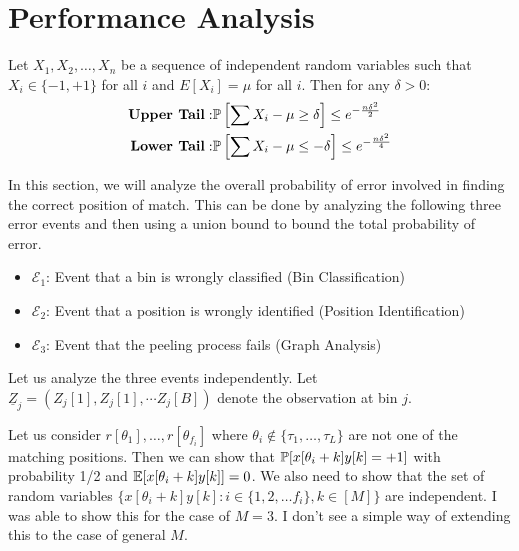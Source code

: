 \section{Performance Analysis}
\def\vgap{2pt}
\begin{lemma}
\label{Lem:Chernoff}
Let $X_1, X_2,\ldots, X_n$ be a sequence of independent random variables such that $X_i \in\{-1, +1\}$ for all $i$ and $E[X_i]=\mu$ for all $i$. Then for any $\delta>0$:
\begin{align*}
\text{\textbf{Upper Tail}}: &\mathbb{P}\left[\sum X_i-\mu\geq \delta\right]\leq e^{-\frac{n\delta^2}{2}}\\
\textbf{Lower Tail}: &\mathbb{P}\left[\sum X_i-\mu\leq -\delta\right]\leq e^{-\frac{n\delta^2}{4}}
\end{align*}
\end{lemma}


In this section, we will analyze the overall probability of error involved in finding the correct position of match. This can be done by analyzing the following three error events and then using a union bound to bound the total probability of error.

\begin{itemize}
	\item $\mathcal{E}_1$: Event that a bin is wrongly classified  (Bin Classification)
	\item $\mathcal{E}_2$: Event that a position is wrongly identified  (Position Identification)
	\item $\mathcal{E}_3$: Event that the peeling process fails (Graph Analysis)
\end{itemize}

Let us analyze the three events independently. Let $\underline{Z}_{j} = (Z_{j}[1], Z_{j}[1], \cdots Z_{j}[B])$ denote the observation at bin $j$. 

\begin{remark}
\label{Lem:CorrelationCoefficient}
Let us consider $r[\theta_1],\ldots ,r[\theta_{f_i}]$ where $\theta_i \notin \{\tau_1,\ldots, \tau_L\}$ are not one of the matching positions. Then we can show that $\mathbb{P}[x[\theta_i+k]y[k]=+1]$ with probability 1/2 and $\mathbb{E}[x[\theta_i+k]y[k]]=0$. We also need to show that  the set of random variables  $\{x[\theta_i+k]y[k]: i\in\{1,2,\ldots f_i\},k\in[M]\}$ are independent. I was able to show this for the case of $M=3$. I don't see a simple way of extending this to the case of general $M$.
\end{remark}

